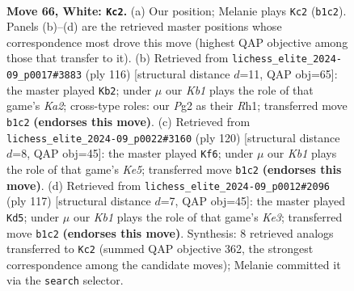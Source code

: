 \documentclass[11pt]{article}
\begin{document}
\clearpage

\begin{figure}[p]\centering
\begin{subfigure}{0.46\textwidth}\centering
\resizebox{\linewidth}{!}{%
\newchessgame
\chessboard[
  setfen={8/1k6/8/RP6/5N2/8/6P1/1K2r3 w - - 1 66},
  showmover=false,
  pgfstyle=straightmove, color=movearrow, markmove={b1-c2}
]}
\caption{}
\end{subfigure}\hfill
\begin{subfigure}{0.46\textwidth}\centering
\resizebox{\linewidth}{!}{%
\newchessgame
\chessboard[
  setfen={8/5k2/7P/r7/8/8/K7/7R w - - 25 59},
  showmover=false,
  pgfstyle=straightmove, color=movearrow, markmove={a2-b2}
]}
\caption{}
\end{subfigure}
\\[4pt]
\begin{subfigure}{0.46\textwidth}\centering
\resizebox{\linewidth}{!}{%
\newchessgame
\chessboard[
  setfen={8/3k4/8/2r1K3/P7/R4P2/8/8 w - - 0 61},
  showmover=false,
  pgfstyle=straightmove, color=movearrow, markmove={e5-f6}
]}
\caption{}
\end{subfigure}\hfill
\begin{subfigure}{0.46\textwidth}\centering
\resizebox{\linewidth}{!}{%
\newchessgame
\chessboard[
  setfen={8/8/2R1kp2/8/1r3p2/8/5K2/8 b - - 1 59},
  showmover=false,
  pgfstyle=straightmove, color=movearrow, markmove={e6-d5}
]}
\caption{}
\end{subfigure}
\caption{\textbf{Move 66, White: \texttt{Kc2}.} (a) Our position; Melanie plays \texttt{Kc2} (\texttt{b1c2}). Panels (b)--(d) are the retrieved master positions whose correspondence most drove this move (highest QAP objective among those that transfer to it). (b) Retrieved from \texttt{lichess\_elite\_2024-09\_p0017\#3883} (ply 116) [structural distance $d$=11, QAP obj=65]: the master played \texttt{Kb2}; under $\mu$ our \emph{Kb1} plays the role of that game's \emph{Ka2}; cross-type roles: our \emph{P}g2 as their \emph{R}h1; transferred move \texttt{b1c2} \textbf{(endorses this move)}. (c) Retrieved from \texttt{lichess\_elite\_2024-09\_p0022\#3160} (ply 120) [structural distance $d$=8, QAP obj=45]: the master played \texttt{Kf6}; under $\mu$ our \emph{Kb1} plays the role of that game's \emph{Ke5}; transferred move \texttt{b1c2} \textbf{(endorses this move)}. (d) Retrieved from \texttt{lichess\_elite\_2024-09\_p0012\#2096} (ply 117) [structural distance $d$=7, QAP obj=45]: the master played \texttt{Kd5}; under $\mu$ our \emph{Kb1} plays the role of that game's \emph{Ke3}; transferred move \texttt{b1c2} \textbf{(endorses this move)}. Synthesis: 8 retrieved analogs transferred to \texttt{Kc2} (summed QAP objective 362, the strongest correspondence among the candidate moves); Melanie committed it via the \texttt{search} selector.}
\label{fig:thought-m130}
\end{figure}
\end{document}
